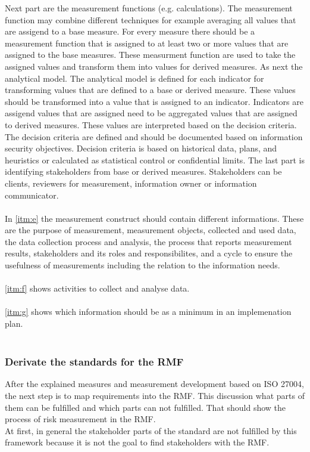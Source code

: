 Next part are the measurement functions (e.g. calculations). The measurement function may combine different techniques for example averaging all values that are assigend to a base measure. For every measure there should be a measurement function that is assigned to at least two or more values that are assigned to the base measures. These measurment function are used to take the assigned values and transform them into values for derived measures. As next the analytical model. The analytical model is defined for each indicator for transforming values that are defined to a base or derived measure. These values should be transformed into a value that is assigned to an indicator. Indicators are assigend values that are assigned need to be aggregated values that are assigned to derived measures. These values are interpreted based on the decision criteria. The decision criteria are defined and should be documented based on information security objectives. Decision criteria is based on historical data, plans, and heuristics or calculated as statistical control or confidential limits. The last part is identifying stakeholders from base or derived measures. Stakeholders can be clients, reviewers for measurement, information owner or information communicator. \\ \\
In \ref{itm:e} the measurement construct should contain different informations. These are the purpose of measurement, measurement objects, collected and used data, the data collection process and analysis, the process that reports measurement results, stakeholders and its roles and responsibilites, and a cycle to ensure the usefulness of measurements including the relation to the information needs. \\ \\
\ref{itm:f} shows activities to collect and analyse data.\\ \\
\ref{itm:g} shows which information should be as a minimum in an implemenation plan. \\ \\

\subsubsection*{Derivate the standards for the RMF}

After the explained measures and measurement development based on ISO 27004, the next step is to map requirements into the RMF. This discussion what parts of them can be fulfilled and which parts can not fulfilled. That should show the process of risk measurement in the RMF. \\
At first, in general the stakeholder parts of the standard are not fulfilled by this framework because it is not the goal to find stakeholders with the RMF.

